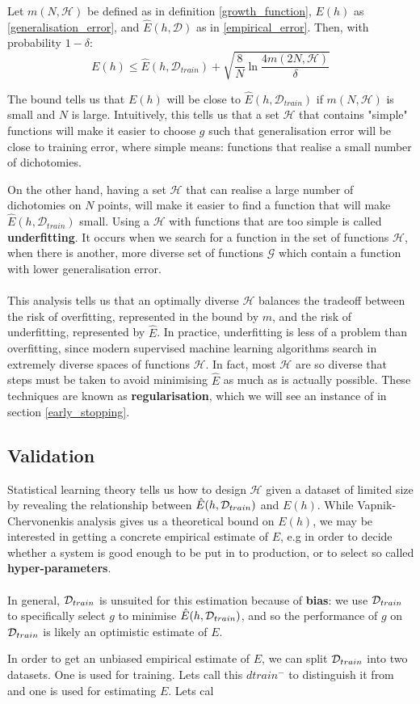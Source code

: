 \begin{theorem}
	\label{vc_bound}
	Let $m(N, \mathcal{H})$ be defined as in definition \ref{growth_function}, $E(h)$ as \ref{generalisation_error}, and $\hat{E}(h, \mathcal{D})$ as in \ref{empirical_error}. Then, with probability $1 - \delta$:
	$$
	E(h) \leq \hat{E}(h, \mathcal{D}_{train}) + \sqrt{\frac{8}{N}\ln \frac{4m(2N, \mathcal{H})}{\delta}}
	$$
\end{theorem}
The bound tells us that $E(h)$ will be close to $\hat{E}(h, \mathcal{D}_{train})$ if $m(N, \mathcal{H})$ is small and $N$ is large. Intuitively, this tells us that a set $\mathcal{H}$ that contains "simple" functions will make it easier to choose $g$ such that generalisation error will be close to training error, where simple means: functions that realise a small number of dichotomies.

On the other hand, having a set $\mathcal{H}$ that can realise a large number of dichotomies on $N$ points, will make it easier to find a function that will make $\hat{E}(h, \mathcal{D}_{train})$ small. Using a $\mathcal{H}$ with functions that are too simple is called \textbf{underfitting}. It occurs when we search for a function in the set of functions $\mathcal{H}$, when there is another, more diverse set of functions $\mathcal{G}$ which contain a function with lower generalisation error.
\\\\
This analysis tells us that an optimally diverse $\mathcal{H}$ balances the tradeoff between the risk of overfitting, represented in the bound by $m$, and the risk of underfitting, represented by $\hat{E}$. In practice, underfitting is less of a problem than overfitting, since modern supervised machine learning algorithms search in extremely diverse spaces of functions $\mathcal{H}$. In fact, most $\mathcal{H}$ are so diverse that steps must be taken to avoid minimising $\hat{E}$ as much as is actually possible. These techniques are known as \textbf{regularisation}, which we will see an instance of in section \ref{early_stopping}.

\subsection{Validation}
Statistical learning theory tells us how to design $\mathcal{H}$ given a dataset of limited size by revealing the relationship between $\hat{E}(h, \mathcal{D}_{train})$ and $E(h)$. While Vapnik-Chervonenkis analysis gives us a theoretical bound on $E(h)$, we may be interested in getting a concrete empirical estimate of $E$, e.g in order to decide whether a system is good enough to be put in to production, or to select so called \textbf{hyper-parameters}.
\\\\
In general, $\mathcal{D}_{train}$ is unsuited for this estimation because of \textbf{bias}: we use $\mathcal{D}_{train}$ to specifically select $g$ to minimise $\hat{E}(h, \mathcal{D}_{train})$, and so the performance of $g$ on $\mathcal{D}_{train}$ is likely an optimistic estimate of $E$.

In order to get an unbiased empirical estimate of $E$, we can split $\mathcal{D}_{train}$ into two datasets. One is used for training. Lets call this $dtrain^-$ to distinguish it from and one is used for estimating $E$. Lets cal